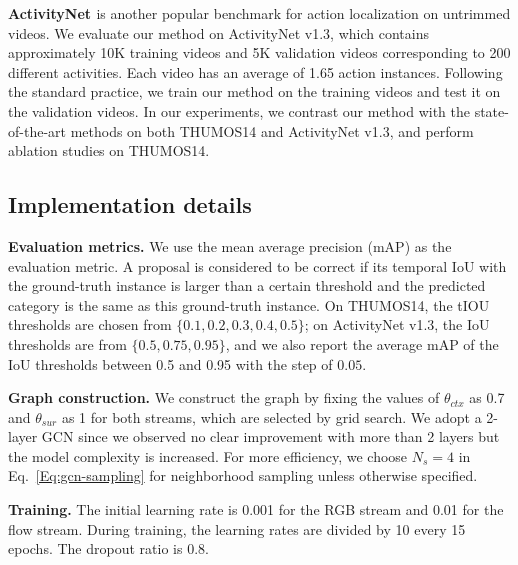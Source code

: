 \documentclass[10pt,journal,compsoc]{IEEEtran}
\begin{document}
	\noindent \textbf{ActivityNet \cite{caba2015activitynet}} is another popular benchmark for action localization on untrimmed videos. We evaluate our method on ActivityNet v1.3, which contains approximately 10K training videos and 5K validation videos corresponding to 200 different activities. Each video has an average of 1.65 action instances. Following the standard practice, we train our method on the training videos and test it on the validation videos. In our experiments, we contrast our method with the state-of-the-art methods on both THUMOS14 and ActivityNet v1.3, and perform ablation studies on THUMOS14.
	
	
	\subsection{Implementation details}
	
	\noindent \textbf{Evaluation metrics.} We use the mean average precision (mAP) as the evaluation metric. 
	A proposal is considered to be correct if its temporal IoU with the ground-truth instance is larger than a certain threshold and the predicted category is the same as this ground-truth instance.
	On THUMOS14, the tIOU thresholds are chosen from $\{0.1, 0.2, 0.3, 0.4, 0.5\}$; on ActivityNet v1.3, the IoU thresholds are from $\{0.5, 0.75, 0.95\}$, and we also report the average mAP of the IoU thresholds between 0.5 and 0.95 with the step of $0.05$.
	
	
	\noindent \textbf{Graph construction.}
	We construct the graph by fixing the values of $\theta_{ctx}$ as 0.7 and  $\theta_{sur}$ as 1 for both streams, which are selected by grid search. We adopt a 2-layer GCN since we observed no clear improvement with more than 2 layers but the model complexity is increased. For more efficiency, we choose $N_{s}=4$ in Eq.~\eqref{Eq:gcn-sampling} for neighborhood sampling unless otherwise specified.
	
	
	\noindent \textbf{Training.} 
	The initial learning rate is 0.001 for the RGB stream and 0.01 for the flow stream. 
	During training, the learning rates are divided by 10 every 15 epochs. The dropout ratio is 0.8.
	
	
	
	
	
\end{document}
